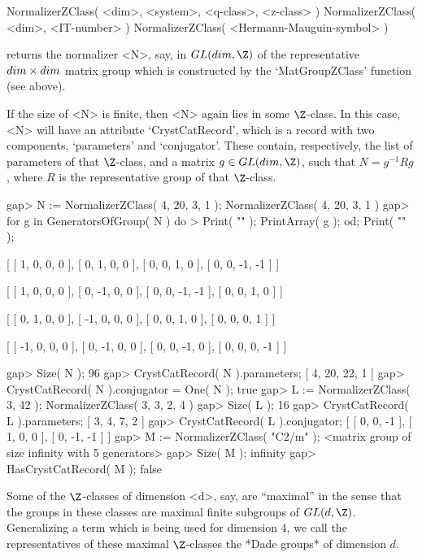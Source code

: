 \>NormalizerZClass( <dim>, <system>, <q-class>, <z-class> )
\>NormalizerZClass( <dim>, <IT-number> )
\>NormalizerZClass( <Hermann-Mauguin-symbol> )

returns the normalizer <N>, say, in $GL(dim,\Z)$ of the representative
$dim \times dim$ matrix group which is constructed by the
`MatGroupZClass' function (see above).

If the size of <N> is finite, then <N> again lies in some $\Z$-class.
In this case, <N> will have an attribute `CrystCatRecord',
which is a record with two components, `parameters' and `conjugator'.
These contain, respectively, the list of parameters of that
$\Z$-class, and a matrix $g \in GL(dim,\Z)$, such that $N = g^{-1} R g$,
where $R$ is the representative group of that $\Z$-class.

\beginexample
gap> N := NormalizerZClass( 4, 20, 3, 1 );
NormalizerZClass( 4, 20, 3, 1 )
gap> for g in GeneratorsOfGroup( N ) do
>  Print( "\n" ); PrintArray( g ); od; Print( "\n" );

[ [   1,   0,   0,   0 ],
  [   0,   1,   0,   0 ],
  [   0,   0,   1,   0 ],
  [   0,   0,  -1,  -1 ] ]

[ [   1,   0,   0,   0 ],
  [   0,  -1,   0,   0 ],
  [   0,   0,  -1,  -1 ],
  [   0,   0,   1,   0 ] ]

[ [   0,   1,   0,   0 ],
  [  -1,   0,   0,   0 ],
  [   0,   0,   1,   0 ],
  [   0,   0,   0,   1 ] ]

[ [  -1,   0,   0,   0 ],
  [   0,  -1,   0,   0 ],
  [   0,   0,  -1,   0 ],
  [   0,   0,   0,  -1 ] ]

gap> Size( N );
96
gap> CrystCatRecord( N ).parameters;
[ 4, 20, 22, 1 ]
gap> CrystCatRecord( N ).conjugator = One( N );
true
gap> L := NormalizerZClass( 3, 42 );
NormalizerZClass( 3, 3, 2, 4 )
gap> Size( L );
16
gap> CrystCatRecord( L ).parameters;
[ 3, 4, 7, 2 ]
gap> CrystCatRecord( L ).conjugator;
[ [ 0, 0, -1 ], [ 1, 0, 0 ], [ 0, -1, -1 ] ]
gap> M := NormalizerZClass( "C2/m" );
<matrix group of size infinity with 5 generators>
gap> Size( M );
infinity
gap> HasCrystCatRecord( M );
false
\endexample


Some of the $\Z$-classes  of   dimension <d>, say, are ``maximal''  in
the sense  that the groups in these  classes are maximal finite subgroups
of $GL(d,\Z)$.  Generalizing a term which is  being used for dimension 4,
we call the representatives   of these  maximal $\Z$-classes  the *Dade
groups* of dimension $d$.

